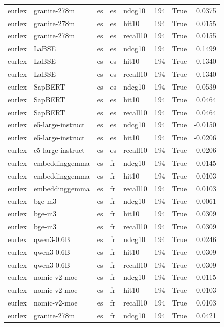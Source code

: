 \begin{tabular}{lllllrrr}
eurlex & granite-278m & es & es & ndcg10 & 194 & True & 0.0375 \\
eurlex & granite-278m & es & es & hit10 & 194 & True & 0.0155 \\
eurlex & granite-278m & es & es & recall10 & 194 & True & 0.0155 \\
eurlex & LaBSE & es & es & ndcg10 & 194 & True & 0.1499 \\
eurlex & LaBSE & es & es & hit10 & 194 & True & 0.1340 \\
eurlex & LaBSE & es & es & recall10 & 194 & True & 0.1340 \\
eurlex & SapBERT & es & es & ndcg10 & 194 & True & 0.0539 \\
eurlex & SapBERT & es & es & hit10 & 194 & True & 0.0464 \\
eurlex & SapBERT & es & es & recall10 & 194 & True & 0.0464 \\
eurlex & e5-large-instruct & es & es & ndcg10 & 194 & True & -0.0150 \\
eurlex & e5-large-instruct & es & es & hit10 & 194 & True & -0.0206 \\
eurlex & e5-large-instruct & es & es & recall10 & 194 & True & -0.0206 \\
eurlex & embeddinggemma & es & fr & ndcg10 & 194 & True & 0.0145 \\
eurlex & embeddinggemma & es & fr & hit10 & 194 & True & 0.0103 \\
eurlex & embeddinggemma & es & fr & recall10 & 194 & True & 0.0103 \\
eurlex & bge-m3 & es & fr & ndcg10 & 194 & True & 0.0061 \\
eurlex & bge-m3 & es & fr & hit10 & 194 & True & 0.0309 \\
eurlex & bge-m3 & es & fr & recall10 & 194 & True & 0.0309 \\
eurlex & qwen3-0.6B & es & fr & ndcg10 & 194 & True & 0.0246 \\
eurlex & qwen3-0.6B & es & fr & hit10 & 194 & True & 0.0309 \\
eurlex & qwen3-0.6B & es & fr & recall10 & 194 & True & 0.0309 \\
eurlex & nomic-v2-moe & es & fr & ndcg10 & 194 & True & 0.0115 \\
eurlex & nomic-v2-moe & es & fr & hit10 & 194 & True & 0.0103 \\
eurlex & nomic-v2-moe & es & fr & recall10 & 194 & True & 0.0103 \\
eurlex & granite-278m & es & fr & ndcg10 & 194 & True & 0.0421 \\

\end{tabular}

